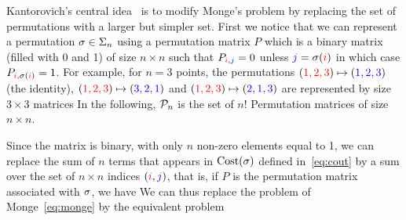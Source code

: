 Kantorovich's central idea~\cite{Kantorovich42} is to modify Monge's problem by replacing the set of permutations with a larger but simpler set. First we notice that we can represent a permutation $\sigma \in \Sigma_n$ using a permutation matrix $P$ which is a binary matrix (filled with 0 and 1) of size $n \times n$ such that $P_{{\color{red}i}, {\color{blue}j}} = 0$ unless ${\color{blue}j} = \sigma ({\color{red}i})$ in which case $P_{{\color{red}i}, \sigma ({\color{red}i})} = 1$. For example, for $n = 3$ points, the permutations
$({\color{red}1,2,3}) \mapsto ({\color{blue}1,2,3})$ (the identity),
$({\color{red}1,2,3}) \mapsto ({\color{blue}3,2,1})$ and
$({\color{red}1,2,3}) \mapsto ({\color{blue}2,1,3})$ are represented by size $3 \times 3$ matrices
In the following, $\mathcal{P}_n$ is the set of $n!$ Permutation matrices of size $n \times n$.

Since the matrix is binary, with only $n$ non-zero elements equal to 1, we can replace the sum of $n$ terms that appears in $\text{Cost}(\sigma)$ defined in~\eqref{eq:cout} by a sum over the set of $n \times n$ indices $({\color{red}i}, {\color{blue}j})$, that is, if $P$ is the permutation matrix associated with $\sigma$, we have
We can thus replace the problem of Monge~\eqref{eq:monge} by the equivalent problem

